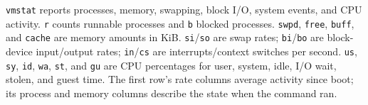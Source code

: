 \texttt{vmstat} reports processes, memory, swapping, block I/O, system events,
and CPU activity. \texttt{r} counts runnable processes and \texttt{b} blocked
processes. \texttt{swpd}, \texttt{free}, \texttt{buff}, and \texttt{cache} are
memory amounts in KiB. \texttt{si}/\texttt{so} are swap rates;
\texttt{bi}/\texttt{bo} are block-device input/output rates;
\texttt{in}/\texttt{cs} are interrupts/context switches per second.
\texttt{us}, \texttt{sy}, \texttt{id}, \texttt{wa}, \texttt{st}, and \texttt{gu}
are CPU percentages for user, system, idle, I/O wait, stolen, and guest time.
The first row's rate columns average activity since boot; its process and
memory columns describe the state when the command ran.
